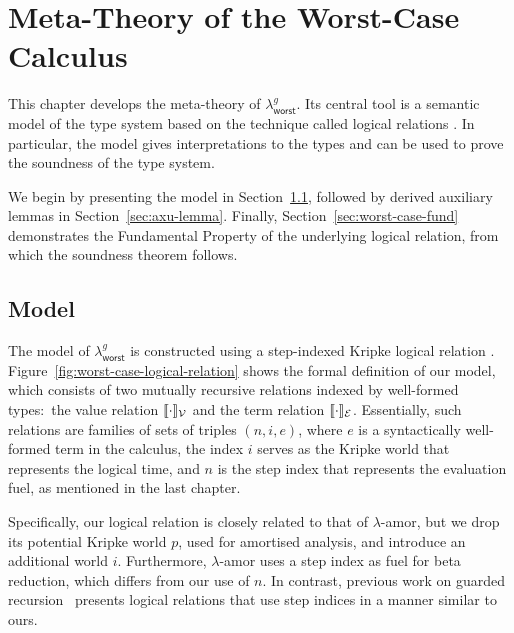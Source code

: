 \chapter{Meta-Theory of the Worst-Case Calculus}
\label{chap:5}

\raggedbottom

\begingroup
\renewcommand{\topfraction}{0.9}
\renewcommand{\bottomfraction}{0.8}
\renewcommand{\textfraction}{0.1}
\renewcommand{\floatpagefraction}{0.75}
\setlength{\textfloatsep}{12pt plus 2pt minus 2pt}
\setlength{\intextsep}{10pt plus 2pt minus 2pt}
\setlength{\floatsep}{10pt plus 2pt minus 2pt}
\makeatletter
\setlength{\@fptop}{0pt}
\setlength{\@fpsep}{16pt plus 2pt}
\setlength{\@fpbot}{0pt plus 1fil}
\makeatother

This chapter develops the meta-theory of $\lambda^g_{\mathsf{worst}}$.
Its central tool is a semantic model of the type system based on the technique called logical relations \citep{tait67}.
In particular, the model gives interpretations to the types and can be used to prove the soundness of the type system. 

We begin by presenting the model in Section~\ref{sec:worst-case-model}, 
followed by derived auxiliary lemmas in Section~\ref{sec:axu-lemma}.
Finally, Section~\ref{sec:worst-case-fund} demonstrates the Fundamental Property of the underlying logical relation, from which the soundness theorem follows.


\section{Model}
\label{sec:worst-case-model}
The model of $\lambda^g_{\mathsf{worst}}$ is constructed using a step-indexed Kripke logical relation \citep{ahmed2004semantics}.
Figure~\ref{fig:worst-case-logical-relation} shows the formal definition of our model, which consists of two
mutually recursive relations indexed by well-formed types:\ the value relation $\llbracket \cdot \rrbracket_{\mathcal{V}}$ and the term relation $\llbracket \cdot \rrbracket_{\mathcal{E}}$.
Essentially, such relations are families of sets of triples $(n, i, e)$, where $e$ is a syntactically well-formed term in the calculus,
the index $i$ serves as the Kripke world that represents the logical time, and $n$ is the step index that represents the evaluation fuel, as mentioned in the last chapter.

Specifically, our logical relation is closely related to that of $\lambda$-amor, but we drop its potential Kripke world $p$, used for amortised analysis, and introduce an additional world $i$. 
Furthermore, $\lambda$-amor uses a step index as fuel for beta reduction, 
which differs from our use of $n$. In contrast, previous work on guarded recursion~\citep{cloustonGuardedLambdaCalculusProgramming2017a,guattoGeneralizedModalityRecursion2018d} 
presents logical relations that use step indices in a manner similar to ours.

